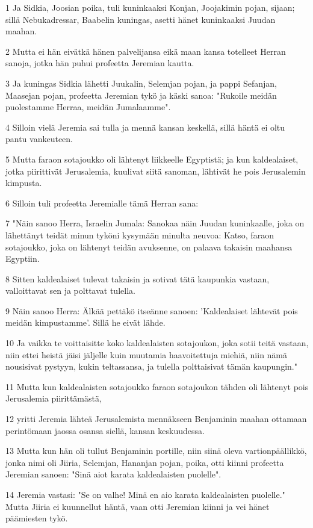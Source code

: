 \par 1 Ja Sidkia, Joosian poika, tuli kuninkaaksi Konjan, Joojakimin pojan, sijaan; sillä Nebukadressar, Baabelin kuningas, asetti hänet kuninkaaksi Juudan maahan.
\par 2 Mutta ei hän eivätkä hänen palvelijansa eikä maan kansa totelleet Herran sanoja, jotka hän puhui profeetta Jeremian kautta.
\par 3 Ja kuningas Sidkia lähetti Juukalin, Selemjan pojan, ja pappi Sefanjan, Maasejan pojan, profeetta Jeremian tykö ja käski sanoa: "Rukoile meidän puolestamme Herraa, meidän Jumalaamme".
\par 4 Silloin vielä Jeremia sai tulla ja mennä kansan keskellä, sillä häntä ei oltu pantu vankeuteen.
\par 5 Mutta faraon sotajoukko oli lähtenyt liikkeelle Egyptistä; ja kun kaldealaiset, jotka piirittivät Jerusalemia, kuulivat siitä sanoman, lähtivät he pois Jerusalemin kimpusta.
\par 6 Silloin tuli profeetta Jeremialle tämä Herran sana:
\par 7 "Näin sanoo Herra, Israelin Jumala: Sanokaa näin Juudan kuninkaalle, joka on lähettänyt teidät minun tyköni kysymään minulta neuvoa: Katso, faraon sotajoukko, joka on lähtenyt teidän avuksenne, on palaava takaisin maahansa Egyptiin.
\par 8 Sitten kaldealaiset tulevat takaisin ja sotivat tätä kaupunkia vastaan, valloittavat sen ja polttavat tulella.
\par 9 Näin sanoo Herra: Älkää pettäkö itseänne sanoen: 'Kaldealaiset lähtevät pois meidän kimpustamme'. Sillä he eivät lähde.
\par 10 Ja vaikka te voittaisitte koko kaldealaisten sotajoukon, joka sotii teitä vastaan, niin ettei heistä jäisi jäljelle kuin muutamia haavoitettuja miehiä, niin nämä nousisivat pystyyn, kukin teltassansa, ja tulella polttaisivat tämän kaupungin."
\par 11 Mutta kun kaldealaisten sotajoukko faraon sotajoukon tähden oli lähtenyt pois Jerusalemia piirittämästä,
\par 12 yritti Jeremia lähteä Jerusalemista mennäkseen Benjaminin maahan ottamaan perintömaan jaossa osansa siellä, kansan keskuudessa.
\par 13 Mutta kun hän oli tullut Benjaminin portille, niin siinä oleva vartionpäällikkö, jonka nimi oli Jiiria, Selemjan, Hananjan pojan, poika, otti kiinni profeetta Jeremian sanoen: "Sinä aiot karata kaldealaisten puolelle".
\par 14 Jeremia vastasi: "Se on valhe! Minä en aio karata kaldealaisten puolelle." Mutta Jiiria ei kuunnellut häntä, vaan otti Jeremian kiinni ja vei hänet päämiesten tykö.
